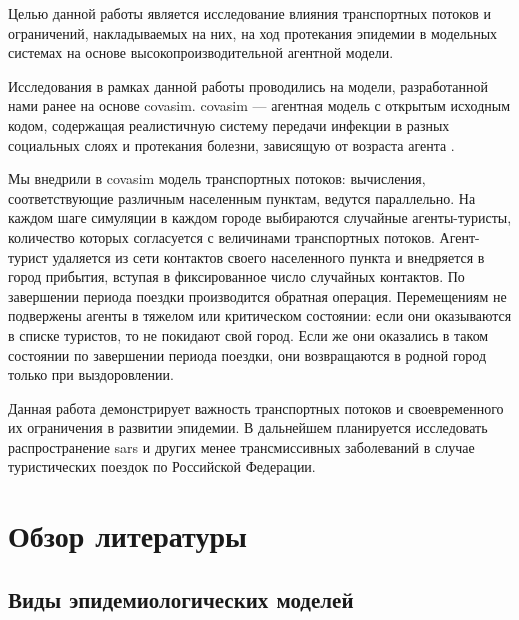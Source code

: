 \documentclass[a4paper,12pt]{article} %
\begin{document}
Целью данной работы является исследование влияния транспортных потоков и ограничений, накладываемых на них, на ход протекания эпидемии в модельных системах на основе высокопроизводительной агентной модели.

Исследования в рамках данной работы проводились на модели, разработанной нами ранее на основе \gls{covasim}. \gls{covasim} — агентная модель с открытым исходным кодом, содержащая реалистичную систему передачи инфекции в разных социальных слоях и протекания болезни, зависящую от возраста агента \cite{kerr2021covasim}.

Мы внедрили в \gls{covasim} модель транспортных потоков: вычисления, соответствующие различным населенным пунктам, ведутся параллельно. На каждом шаге симуляции в каждом городе выбираются случайные агенты-туристы, количество которых согласуется с величинами транспортных потоков. Агент-турист удаляется из сети контактов своего населенного пункта и внедряется в город прибытия, вступая в фиксированное число случайных контактов. По завершении периода поездки производится обратная операция. Перемещениям не подвержены агенты в тяжелом или критическом состоянии: если они оказываются в списке туристов, то не покидают свой город. Если же они оказались в таком состоянии по завершении периода поездки, они возвращаются в родной город только при выздоровлении.

Данная работа демонстрирует важность транспортных потоков и своевременного их ограничения в развитии эпидемии. В дальнейшем планируется исследовать распространение \gls{sars} и других менее трансмиссивных заболеваний в случае туристических поездок по Российской Федерации.


\section{Обзор литературы}
\subsection{Виды эпидемиологических моделей}
\end{document}
